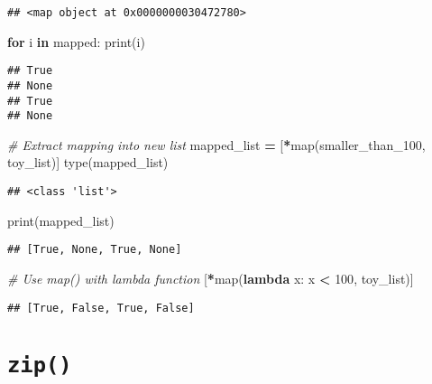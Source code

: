 \documentclass[
]{book}
\newenvironment{Shaded}{\begin{snugshade}}{\end{snugshade}}
\newcommand{\BuiltInTok}[1]{#1}
\newcommand{\CommentTok}[1]{\textcolor[rgb]{0.56,0.35,0.01}{\textit{#1}}}
\newcommand{\ControlFlowTok}[1]{\textcolor[rgb]{0.13,0.29,0.53}{\textbf{#1}}}
\newcommand{\DecValTok}[1]{\textcolor[rgb]{0.00,0.00,0.81}{#1}}
\newcommand{\KeywordTok}[1]{\textcolor[rgb]{0.13,0.29,0.53}{\textbf{#1}}}
\newcommand{\NormalTok}[1]{#1}
\newcommand{\OperatorTok}[1]{\textcolor[rgb]{0.81,0.36,0.00}{\textbf{#1}}}
\begin{document}
\begin{verbatim}
## <map object at 0x0000000030472780>
\end{verbatim}

\begin{Shaded}
\begin{Highlighting}[]
\ControlFlowTok{for}\NormalTok{ i }\KeywordTok{in}\NormalTok{ mapped:}
    \BuiltInTok{print}\NormalTok{(i)}
\end{Highlighting}
\end{Shaded}

\begin{verbatim}
## True
## None
## True
## None
\end{verbatim}

\begin{Shaded}
\begin{Highlighting}[]
\CommentTok{\# Extract mapping into new list}
\NormalTok{mapped\_list }\OperatorTok{=}\NormalTok{ [}\OperatorTok{*}\BuiltInTok{map}\NormalTok{(smaller\_than\_100, toy\_list)]}
\BuiltInTok{type}\NormalTok{(mapped\_list)}
\end{Highlighting}
\end{Shaded}

\begin{verbatim}
## <class 'list'>
\end{verbatim}

\begin{Shaded}
\begin{Highlighting}[]
\BuiltInTok{print}\NormalTok{(mapped\_list)}
\end{Highlighting}
\end{Shaded}

\begin{verbatim}
## [True, None, True, None]
\end{verbatim}

\begin{Shaded}
\begin{Highlighting}[]
\CommentTok{\# Use map() with lambda function}
\NormalTok{[}\OperatorTok{*}\BuiltInTok{map}\NormalTok{(}\KeywordTok{lambda}\NormalTok{ x: x }\OperatorTok{\textless{}} \DecValTok{100}\NormalTok{, toy\_list)]}
\end{Highlighting}
\end{Shaded}

\begin{verbatim}
## [True, False, True, False]
\end{verbatim}

\hypertarget{zip}{%
\section{\texorpdfstring{\texttt{zip()}}{zip()}}\label{zip}}
\end{document}
